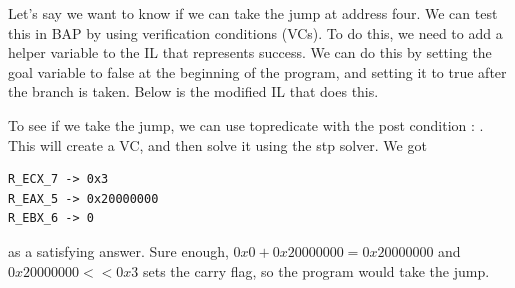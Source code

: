 Let's say we want to know if we can take the jump at address four.  We
can test this in BAP by using verification conditions (VCs).  To do
this, we need to add a helper variable to the IL that represents
success.  We can do this by setting the goal variable to false at the
beginning of the program, and setting it to true after the branch is
taken.  Below is the modified IL that does this.



To see if we take the jump, we can use topredicate with the post
condition : .  This will create a VC, and then solve it
using the stp solver.  We got
\begin{verbatim}
R_ECX_7 -> 0x3
R_EAX_5 -> 0x20000000
R_EBX_6 -> 0
\end{verbatim}
as a satisfying answer. Sure enough, $0x0 + 0x20000000 = 0x20000000$
and $0x20000000 << 0x3$ sets the carry flag, so the program would take the jump.
